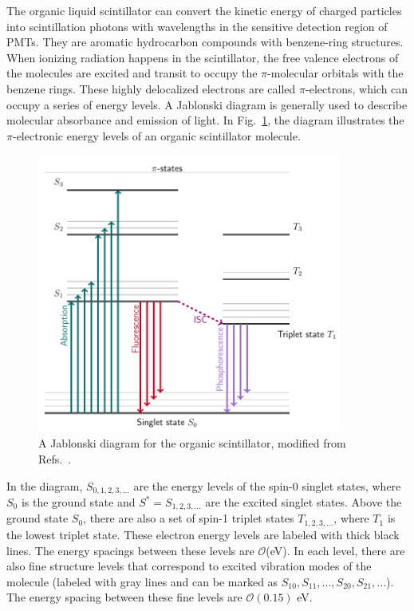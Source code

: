 The organic liquid scintillator can convert the kinetic energy of charged particles into scintillation photons with wavelengths in the sensitive detection region of PMTs. They are aromatic hydrocarbon compounds with benzene-ring structures. When ionizing radiation happens in the scintillator, the free valence electrons of the molecules are excited and transit to occupy the $\pi$-molecular orbitals with the benzene rings. These highly delocalized electrons are called $\pi$-electrons, which can occupy a series of energy levels. A Jablonski diagram is generally used to describe molecular absorbance and emission of light. In Fig.~\ref{jablonski}, the diagram illustrates the $\pi$-electronic energy levels of an organic scintillator molecule\cite{knoll2010radiation,leo2012techniques}. 
\begin{figure}[!htb]
	\centering
	\includegraphics[width=10cm]{jablonski.png}
	\caption[A Jablonski diagram for the organic scintillator.]{A Jablonski diagram for the organic scintillator, modified from Refs.~\cite{birks1965theory, knoll2010radiation}.}
	\label{jablonski}
\end{figure}
In the diagram, $S_{0,1,2,3,...}$ are the energy levels of the spin-0 singlet states, where $S_0$ is the ground state and $S^*=S_{1,2,3,...}$ are the excited singlet states. Above the ground state $S_0$, there are also a set of spin-1 triplet states $T_{1,2,3,...}$, where $T_1$ is the lowest triplet state. These electron energy levels are labeled with thick black lines. The energy spacings between these levels are $\mathcal{O}$(eV). In each level, there are also fine structure levels that correspond to excited vibration modes of the molecule (labeled with gray lines and can be marked as $S_{10}, S_{11}, ..., S_{20}, S_{21}, ...$). The energy spacing between these fine levels are $\mathcal{O}(0.15)$ eV\cite{leo2012techniques, knoll2010radiation}.

